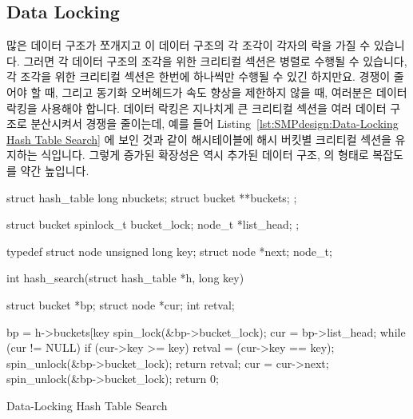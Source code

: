 \subsection{Data Locking}
\label{sec:SMPdesign:Data Locking}

많은 데이터 구조가 쪼개지고 이 데이터 구조의 각 조각이 각자의 락을 가질 수
있습니다.
그러면 각 데이터 구조의 조각을 위한 크리티컬 섹션은 병렬로 수행될 수 있습니다,
각 조각을 위한 크리티컬 섹션은 한번에 하나씩만 수행될 수 있긴 하지만요.
경쟁이 줄어야 할 때, 그리고 동기화 오버헤드가 속도 향상을 제한하지 않을 때,
여러분은 데이터 락킹을 사용해야 합니다.
데이터 락킹은 지나치게 큰 크리티컬 섹션을 여러 데이터 구조로 분산시켜서 경쟁을
줄이는데, 예를 들어
Listing~\ref{lst:SMPdesign:Data-Locking Hash Table Search}
에 보인 것과 같이 해시테이블에 해시 버킷별 크리티컬 섹션을 유지하는 식입니다.
그렇게 증가된 확장성은 역시 추가된 데이터 구조,  의 형태로
복잡도를 약간 높입니다.

\begin{listing}[tb]
\begin{VerbatimL}
struct hash_table
{
	long nbuckets;
	struct bucket **buckets;
};

struct bucket {
	spinlock_t bucket_lock;
	node_t *list_head;
};

typedef struct node {
	unsigned long key;
	struct node *next;
} node_t;

int hash_search(struct hash_table *h, long key)
{
	struct bucket *bp;
	struct node *cur;
	int retval;

	bp = h->buckets[key %
	spin_lock(&bp->bucket_lock);
	cur = bp->list_head;
	while (cur != NULL) {
		if (cur->key >= key) {
			retval = (cur->key == key);
			spin_unlock(&bp->bucket_lock);
			return retval;
		}
		cur = cur->next;
	}
	spin_unlock(&bp->bucket_lock);
	return 0;
}
\end{VerbatimL}
\caption{Data-Locking Hash Table Search}
\label{lst:SMPdesign:Data-Locking Hash Table Search}
\end{listing}

